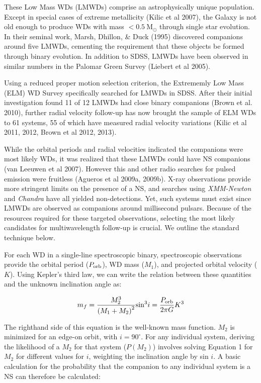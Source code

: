 \documentclass[letterpaper,12pt,preprint]{aastex}
\newcommand{\Msun}{\mathrm{M}_\odot}
\begin{document}
These Low Mass WDs (LMWDs) comprise an astrophysically unique population. Except in special cases of extreme metallicity (Kilic et al 2007), the Galaxy is not old enough to produce WDs with mass $<0.5~\Msun$ through single star evolution. In their seminal work, Marsh, Dhillon, \& Duck (1995) discovered companions around five LMWDs, cementing the requirement that these objects be formed through binary evolution. In addition to SDSS, LMWDs have been observed in similar numbers in the Palomar Green Survey (Liebert et al 2005).

Using a reduced proper motion selection criterion, the Extrememly Low Mass (ELM) WD Survey specifically searched for LMWDs in SDSS. After their initial investigation found 11 of 12 LMWDs had close binary companions (Brown et al. 2010), further radial velocity follow-up has now brought the sample of ELM WDs to 61 systems, 55 of which have measured radial velocity variations (Kilic et al 2011, 2012, Brown et al 2012, 2013).


While the orbital periods and radial velocities indicated the companions were most likely WDs, it was realized that these LMWDs could have NS companions (van Leeuwen et al 2007). However this and other radio searches for pulsed emission were fruitless (Agueros et al 2009a, 2009b). X-ray observations provide more stringent limits on the presence of a NS, and searches using {\it XMM-Newton} and {\it Chandra} have all yielded non-detections. Yet, such systems must exist since LMWDs are observed as companions around millisecond pulsars. Because of the resources required for these targeted observations, selecting the most likely candidates for multiwavelength follow-up is crucial. We outline the standard technique below.


For each WD in a single-line spectroscopic binary, spectroscopic observations provide the orbital period ($P_{\rm orb}$), WD mass ($M_1$), and projected orbital velocity ($K$). Using Kepler's third law, we can write the relation between these quantities and the unknown inclination angle as:

\begin{equation}
	m_f = \frac{M_2^3}{\left(M_1+M_2\right)^2} {\rm sin}^3 i = \frac{P_{\rm orb}}{2\pi G} K^3 \label{eq:massfunc}
\end{equation}

The righthand side of this equation is the well-known mass function. $M_2$ is minimized for an edge-on orbit, with $i = 90^{\circ}$. For any individual system, deriving the likelihood of a $M_2$ for that system ($P(M_2)$) involves solving Equation 1 for $M_2$ for different values for $i$, weighting the inclination angle by sin $i$. A basic calculation for the probability that the companion to any individual system is a NS can therefore be calculated:
\end{document}

